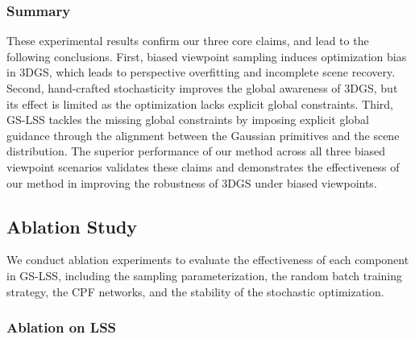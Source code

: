 \documentclass[lettersize,journal]{IEEEtran}
\begin{document}
\subsubsection{Summary}

These experimental results confirm our three core claims, and lead to the following conclusions. 
First, biased viewpoint sampling induces optimization bias in 3DGS, which leads to perspective overfitting and incomplete scene recovery. 
Second, hand-crafted stochasticity improves the global awareness of 3DGS, but its effect is limited as the optimization lacks explicit global constraints. 
Third, GS-LSS tackles the missing global constraints by imposing explicit global guidance through the alignment between the Gaussian primitives and the scene distribution.
The superior performance of our method across all three biased viewpoint scenarios validates these claims and demonstrates the effectiveness of our method in improving the robustness of 3DGS under biased viewpoints.


\subsection{Ablation Study}

We conduct ablation experiments to evaluate the effectiveness of each component in GS-LSS, including the sampling parameterization, 
{the random batch training strategy,}
the CPF networks, and the stability of the stochastic optimization.

\subsubsection{Ablation on LSS}
\end{document}
